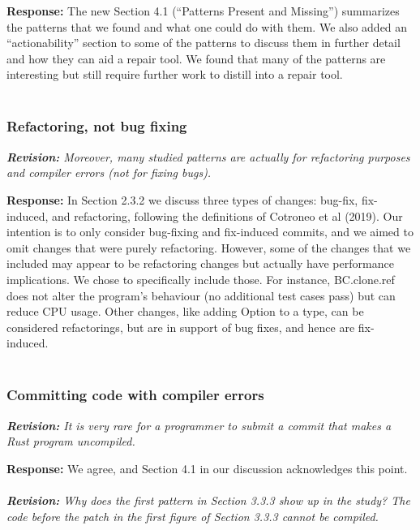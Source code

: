 \documentclass{article}
\begin{document}
\textbf{Response:} The new Section 4.1 (“Patterns Present and Missing”) summarizes the patterns that we found and what one could do with them. We also added an “actionability” section to some of the patterns to discuss them in further detail and how they can aid a repair tool. We found that many of the patterns are interesting but still require further work to distill into a repair tool. \\ \\

\subsubsection{Refactoring, not bug fixing}

\textit{\textbf{Revision:} Moreover, many studied patterns are actually for refactoring purposes and compiler errors (not for fixing bugs).}

\textbf{Response:} In Section 2.3.2 we discuss three types of changes: bug-fix, fix-induced, and refactoring, following the definitions of Cotroneo et al (2019). Our intention is to only consider bug-fixing and fix-induced commits, and we aimed to omit changes that were purely refactoring. However, some of the changes that we included may appear to be refactoring changes but actually have performance implications. We chose to specifically include those. For instance, BC.clone.ref does not alter the program's behaviour (no additional test cases pass) but can reduce CPU usage. Other changes, like adding Option to a type, can be considered refactorings, but are in support of bug fixes, and hence are fix-induced. \\ \\

\subsubsection{Committing code with compiler errors}

\textit{\textbf{Revision:} It is very rare for a programmer to submit a commit that makes a Rust program uncompiled.}

\textbf{Response:} We agree, and Section 4.1 in our discussion acknowledges this point. \\ \\

\textit{\textbf{Revision:} Why does the first pattern in Section 3.3.3 show up in the study? The code before the patch in the first figure of Section 3.3.3 cannot be compiled.}
\end{document}
